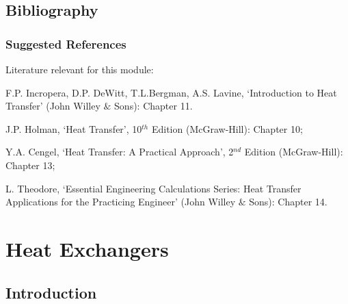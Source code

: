 \documentclass[10pt,compress,handout,ignorenonframetext,unknownkeysallowed]{beamer}
\begin{document}
\subsection{Bibliography} 

\begin{frame}
 \frametitle{Suggested References}
  Literature relevant for this module:
  \begin{enumerate}[{[}1{]}]
    \item F.P. Incropera, D.P. DeWitt, T.L.Bergman, A.S. Lavine, `Introduction to Heat Transfer' (John Willey $\&$ Sons): Chapter 11.
    \item J.P. Holman, `Heat Transfer', 10$^{th}$ Edition (McGraw-Hill): Chapter 10;
    \item Y.A. Cengel, `Heat Transfer: A Practical Approach', 2$^{nd}$ Edition (McGraw-Hill): Chapter 13;
    \item L. Theodore, `Essential Engineering Calculations Series: Heat Transfer Applications for the Practicing Engineer' (John Willey $\&$ Sons): Chapter 14.
  \end{enumerate}
\end{frame}


\section{Heat Exchangers} 

\subsection{Introduction}
\end{document}
